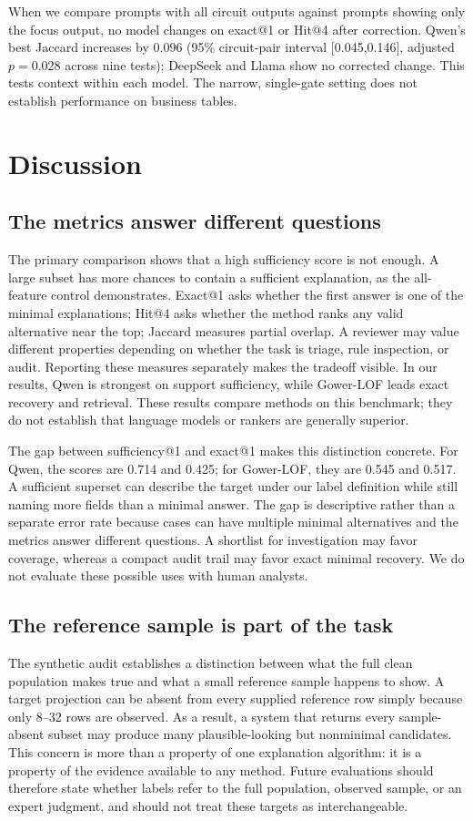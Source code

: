 \documentclass[conference]{IEEEtran}
\begin{document}
When we compare prompts with all circuit outputs against prompts showing only the focus output, no model changes on exact@1 or Hit@4 after correction. Qwen's best Jaccard increases by 0.096 (95\% circuit-pair interval [0.045,0.146], adjusted $p=0.028$ across nine tests); DeepSeek and Llama show no corrected change. This tests context within each model. The narrow, single-gate setting does not establish performance on business tables.

\section{Discussion}
\subsection{The metrics answer different questions}
The primary comparison shows that a high sufficiency score is not enough. A large subset has more chances to contain a sufficient explanation, as the all-feature control demonstrates. Exact@1 asks whether the first answer is one of the minimal explanations; Hit@4 asks whether the method ranks any valid alternative near the top; Jaccard measures partial overlap. A reviewer may value different properties depending on whether the task is triage, rule inspection, or audit. Reporting these measures separately makes the tradeoff visible. In our results, Qwen is strongest on support sufficiency, while Gower-LOF leads exact recovery and retrieval. These results compare methods on this benchmark; they do not establish that language models or rankers are generally superior.

The gap between sufficiency@1 and exact@1 makes this distinction concrete. For Qwen, the scores are 0.714 and 0.425; for Gower-LOF, they are 0.545 and 0.517. A sufficient superset can describe the target under our label definition while still naming more fields than a minimal answer. The gap is descriptive rather than a separate error rate because cases can have multiple minimal alternatives and the metrics answer different questions. A shortlist for investigation may favor coverage, whereas a compact audit trail may favor exact minimal recovery. We do not evaluate these possible uses with human analysts.

\subsection{The reference sample is part of the task}
The synthetic audit establishes a distinction between what the full clean population makes true and what a small reference sample happens to show. A target projection can be absent from every supplied reference row simply because only 8--32 rows are observed. As a result, a system that returns every sample-absent subset may produce many plausible-looking but nonminimal candidates. This concern is more than a property of one explanation algorithm: it is a property of the evidence available to any method. Future evaluations should therefore state whether labels refer to the full population, observed sample, or an expert judgment, and should not treat these targets as interchangeable.
\end{document}
